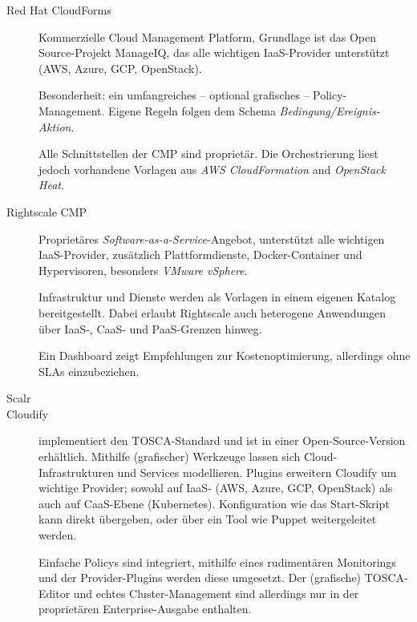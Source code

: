 

\begin{description}
	
	\item[Red Hat CloudForms\footnotemark]
	Kommerzielle Cloud Management Platform, Grundlage ist das Open Source-Projekt  ManageIQ\footnotemark{}, das alle wichtigen IaaS-Provider unterstützt (AWS, Azure, GCP, OpenStack).	
	
	Besonderheit: ein umfangreiches -- optional grafisches -- Policy-Management. Eigene Regeln folgen dem Schema \emph{Bedingung/Ereignis-Aktion}.
	
	Alle Schnittstellen der CMP sind proprietär. Die Orchestrierung liest jedoch vorhandene Vorlagen aus \emph{AWS CloudFormation} and \emph{OpenStack Heat}.
	
	\item[Rightscale CMP\footnotemark]
	Proprietäres \emph{Software-as-a-Service}-Angebot, unterstützt alle wichtigen IaaS-Provider, zusätzlich Plattformdienste, Docker-Container und Hypervisoren, besonders \emph{VMware vSphere}.
	
	Infrastruktur und Dienste werden als Vorlagen in einem eigenen Katalog bereitgestellt. Dabei erlaubt Rightscale auch heterogene Anwendungen über IaaS-, CaaS- und PaaS-Grenzen hinweg.
	
	Ein Dashboard zeigt Empfehlungen zur Kostenoptimierung, allerdings ohne SLAs einzubeziehen.
	
	\item[Scalr] 
	
	
	\item[Cloudify\footnotemark] implementiert den TOSCA-Standard und ist in einer Open-Source-Version erhältlich. Mithilfe (grafischer) Werkzeuge lassen sich Cloud-Infrastrukturen und Services modellieren. Plugins erweitern Cloudify um wichtige Provider; sowohl auf IaaS- (AWS, Azure, GCP, OpenStack) als auch auf CaaS-Ebene (Kubernetes). Konfiguration wie das Start-Skript kann direkt übergeben, oder über ein Tool wie Puppet weitergeleitet werden. 
	
	Einfache Policys sind integriert, mithilfe eines rudimentären Monitorings und der Provider-Plugins werden diese umgesetzt. Der (grafische) TOSCA-Editor und echtes Cluster-Management sind allerdings nur in der proprietären Enterprise-Ausgabe enthalten.


\end{description}

